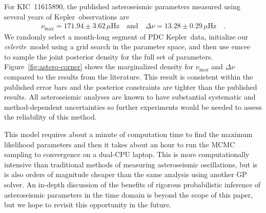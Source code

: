 \documentclass[manuscript, letterpaper]{aastex6}
\newcommand{\project}[1]{\textsf{#1}}
\newcommand{\kepler}{\project{Kepler}}
\newcommand{\celeriteterm}{\emph{celerite}}
\newcommand{\emcee}{\project{emcee}}
\newcommand{\figureref}[1]{\ref{fig:#1}}
\newcommand{\Figure}[1]{Figure~\figureref{#1}}
\begin{document}
For KIC~11615890, the published asteroseismic parameters measured using several
years of \kepler\ observations are \citep{Pinsonneault:2014}
\begin{eqnarray}
    \nu_\mathrm{max} = 171.94 \pm 3.62 \,\mu\mathrm{Hz} \quad\mathrm{and}\quad
    \Delta\nu = 13.28 \pm 0.29 \,\mu\mathrm{Hz} \quad.
\end{eqnarray}
We randomly select a month-long segment of PDC \citep{Stumpe:2012, Smith:2012}
\kepler\ data, initialize our \celeriteterm\ model using a grid search in the
parameter space, and then use \emcee\ \citep{Foreman-Mackey:2013} to sample
the joint posterior density for the full set of parameters.
\Figure{astero-corner} shows the marginalized density for $\nu_\mathrm{max}$
and $\Delta\nu$ compared to the results from the literature.
This result is consistent within the published error bars and the posterior
constraints are tighter than the published results.
All asteroseismic analyses are known to have substantial systematic and
method-dependent uncertainties \citep{Verner:2011} so further experiments
would be needed to assess the reliability of this method.

This model requires about a minute of computation time to find the maximum
likelihood parameters and then it takes about an hour to run the MCMC sampling
to convergence on a dual-CPU laptop.
This is more computationally intensive than traditional methods of measuring
asteroseismic oscillations, but is is also orders of magnitude cheaper than the
same analysis using another GP solver.
An in-depth discussion of the benefits of rigorous probabilistic inference of
asteroseismic parameters in the time domain is beyond the scope of this paper,
but we hope to revisit this opportunity in the future.


\end{document}
